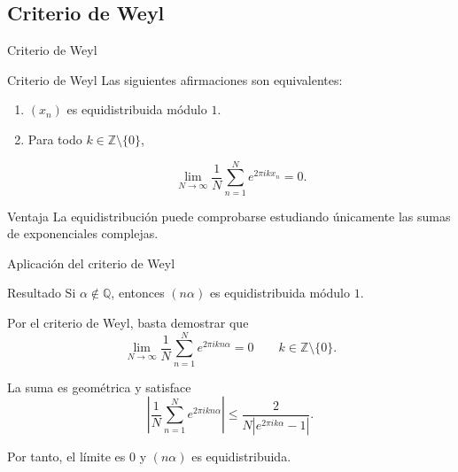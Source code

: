 \subsection{Criterio de Weyl}
\begin{frame}{Criterio de Weyl}

\begin{block}{Criterio de Weyl}
Las siguientes afirmaciones son equivalentes:

\begin{enumerate}
\item $(x_n)$ es equidistribuida módulo $1$.
\item Para todo $k\in\mathbb Z\setminus\{0\}$,

\[
\lim_{N\to\infty} \frac{1}{N}\sum_{n=1}^{N}e^{2\pi i k x_n}=0.
\]
\end{enumerate}
\end{block}

\vspace{0.2cm}
\pause

\begin{exampleblock}{Ventaja}
La equidistribución puede comprobarse estudiando
únicamente las sumas de exponenciales complejas.
\end{exampleblock}

\end{frame}

\begin{frame}{Aplicación del criterio de Weyl}

\begin{block}{Resultado}
Si $\alpha\notin\mathbb Q$, entonces $(n\alpha)$
es equidistribuida módulo $1$.
\end{block}

\vspace{0.1cm}
\pause

Por el criterio de Weyl, basta demostrar que
\[
\lim_{N\to\infty}\frac{1}{N}\sum_{n=1}^{N}e^{2\pi i k n\alpha}=0
\qquad k \in \mathbb{Z} \setminus \{0\}.
\]

\pause

La suma es geométrica y satisface
\[
\left|\frac{1}{N}\sum_{n=1}^{N} e^{2\pi i k n\alpha}\right|
\le\frac{2}{N|e^{2\pi i k\alpha}-1|}.
\]

Por tanto, el límite es $0$ y $(n\alpha)$ es equidistribuida.
\end{frame}


